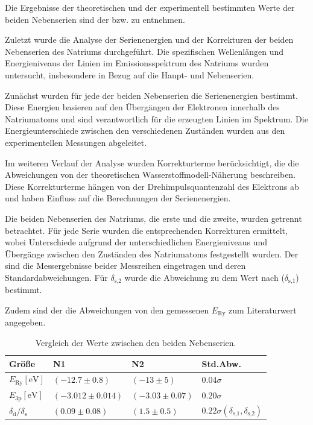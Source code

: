 Die Ergebnisse der theoretischen und der experimentell bestimmten Werte der beiden Nebenserien sind der  bzw.  zu entnehmen.

Zuletzt wurde die Analyse der Serienenergien und der Korrekturen der beiden Nebenserien des Natriums durchgeführt. Die spezifischen Wellenlängen und Energieniveaus der Linien im Emissionsspektrum des Natriums wurden untersucht, insbesondere in Bezug auf die Haupt- und Nebenserien.

Zunächst wurden für jede der beiden Nebenserien die Serienenergien bestimmt. Diese Energien basieren auf den Übergängen der Elektronen innerhalb des Natriumatoms und sind verantwortlich für die erzeugten Linien im Spektrum. Die Energieunterschiede zwischen den verschiedenen Zuständen wurden aus den experimentellen Messungen abgeleitet.

Im weiteren Verlauf der Analyse wurden Korrekturterme berücksichtigt, die die Abweichungen von der theoretischen Wasserstoffmodell-Näherung beschreiben. Diese Korrekturterme hängen von der Drehimpulsquantenzahl des Elektrons ab und haben Einfluss auf die Berechnungen der Serienenergien.

Die beiden Nebenserien des Natriums, die erste und die zweite, wurden getrennt betrachtet. Für jede Serie wurden die entsprechenden Korrekturen ermittelt, wobei Unterschiede aufgrund der unterschiedlichen Energieniveaus und Übergänge zwischen den Zuständen des Natriumatoms festgestellt wurden.
Der  sind die Messergebnisse beider Messreihen eingetragen und deren Standardabweichungen. Für $\delta_\text{s,2}$ wurde die Abweichung zu dem Wert nach  ($\delta_\text{s,1}$) bestimmt.

Zudem sind der  die Abweichungen von den gemessenen $E_\text{Ry}$ zum Literaturwert angegeben.

\begin{table}[h!]
    \centering
    \caption{Vergleich der Werte zwischen den beiden Nebenserien.}
    \centering
    \begin{tabular}{l|l|l||l}
        \toprule
        \textbf{Größe} & \textbf{N1} & \textbf{N2} & \textbf{Std.Abw.}\\
        \midrule
        $E_\text{Ry} [\mathrm{eV}]$ & $(-12.7 \pm 0.8)$ & $(-13 \pm 5)$ & $0.04\sigma$\\
        $E_\text{3p} [\mathrm{eV}]$ & $(-3.012 \pm 0.014)$ & $(-3.03 \pm 0.07)$ & $0.20\sigma$\\
        $\delta_\text{d}/\delta_\text{s}$ & $(0.09 \pm 0.08)$ & $(1.5 \pm 0.5)$ & $0.22\sigma (\delta_\text{s,1},\delta_\text{s,2})$\\
        \bottomrule
    \end{tabular}
    \label{tab:werte_comparison}
\end{table}

